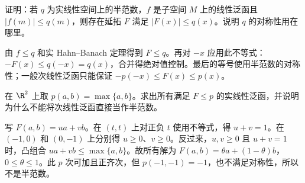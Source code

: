 \begin{exercise}
证明：若 $q$ 为实线性空间上的半范数，$f$ 是子空间 $M$ 上的线性泛函且 $|f(m)|\le q(m)$，则存在延拓 $F$ 满足 $|F(x)|\le q(x)$。说明 $q$ 的对称性用在哪里。
\end{exercise}
\begin{solution}
由 $f\le q$ 和实 Hahn--Banach 定理得到 $F\le q$。再对 $-x$ 应用此不等式：$-F(x)\le q(-x)=q(x)$，合并得绝对值控制。最后的等号使用半范数的对称性；一般次线性泛函只能保证 $-p(-x)\le F(x)\le p(x)$。
\end{solution}

\begin{exercise}
在 $\R^2$ 上取 $p(a,b)=\max\{a,b\}$。求出所有满足 $F\le p$ 的实线性泛函，并说明为什么不能将次线性泛函直接当作半范数。
\end{exercise}
\begin{solution}
写 $F(a,b)=ua+vb$。在 $(t,t)$ 上对正负 $t$ 使用不等式，得 $u+v=1$。在 $(-1,0)$ 和 $(0,-1)$ 上分别得 $u\ge0$、$v\ge0$。反过来，$u,v\ge0$ 且 $u+v=1$ 时，凸组合 $ua+vb\le\max\{a,b\}$。故所有解为 $F(a,b)=\theta a+(1-\theta)b$，$0\le\theta\le1$。此 $p$ 次可加且正齐次，但 $p(-1,-1)=-1$，也不满足对称性，所以不是半范数。
\end{solution}
